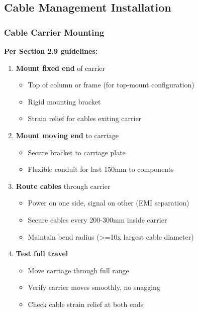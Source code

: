 \documentclass[
]{article}
\providecommand{\tightlist}{%
  \setlength{\itemsep}{0pt}\setlength{\parskip}{0pt}}
\begin{document}
\subsection{Cable Management
Installation}\label{cable-management-installation}

\subsubsection{Cable Carrier Mounting}\label{cable-carrier-mounting}

\textbf{Per Section 2.9 guidelines:}

\begin{enumerate}
\def\labelenumi{\arabic{enumi}.}
\tightlist
\item
  \textbf{Mount fixed end} of carrier

  \begin{itemize}
  \tightlist
  \item
    Top of column or frame (for top-mount configuration)
  \item
    Rigid mounting bracket
  \item
    Strain relief for cables exiting carrier
  \end{itemize}
\item
  \textbf{Mount moving end} to carriage

  \begin{itemize}
  \tightlist
  \item
    Secure bracket to carriage plate
  \item
    Flexible conduit for last 150mm to components
  \end{itemize}
\item
  \textbf{Route cables} through carrier

  \begin{itemize}
  \tightlist
  \item
    Power on one side, signal on other (EMI separation)
  \item
    Secure cables every 200-300mm inside carrier
  \item
    Maintain bend radius (\textgreater=10x largest cable diameter)
  \end{itemize}
\item
  \textbf{Test full travel}

  \begin{itemize}
  \tightlist
  \item
    Move carriage through full range
  \item
    Verify carrier moves smoothly, no snagging
  \item
    Check cable strain relief at both ends
  \end{itemize}
\end{enumerate}
\end{document}
